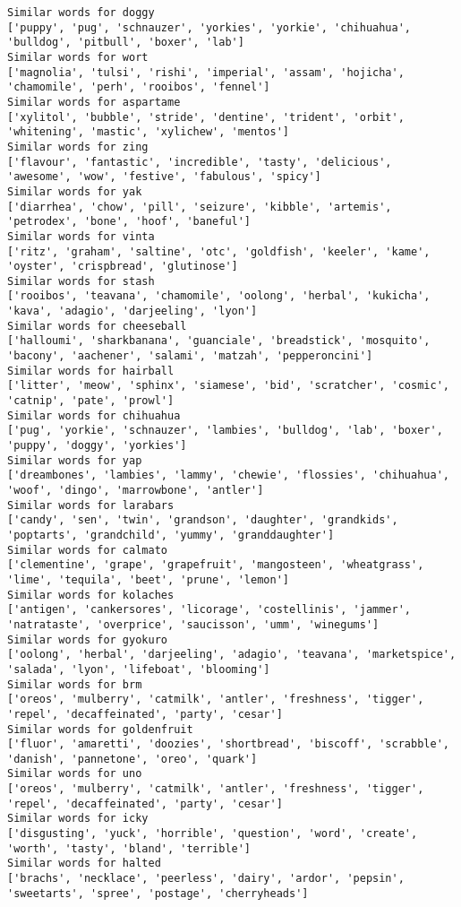 \documentclass[11pt]{article}
\begin{document}
\begin{Verbatim}[commandchars=\\\{\}]
Similar words for doggy
['puppy', 'pug', 'schnauzer', 'yorkies', 'yorkie', 'chihuahua', 'bulldog', 'pitbull', 'boxer', 'lab']
Similar words for wort
['magnolia', 'tulsi', 'rishi', 'imperial', 'assam', 'hojicha', 'chamomile', 'perh', 'rooibos', 'fennel']
Similar words for aspartame
['xylitol', 'bubble', 'stride', 'dentine', 'trident', 'orbit', 'whitening', 'mastic', 'xylichew', 'mentos']
Similar words for zing
['flavour', 'fantastic', 'incredible', 'tasty', 'delicious', 'awesome', 'wow', 'festive', 'fabulous', 'spicy']
Similar words for yak
['diarrhea', 'chow', 'pill', 'seizure', 'kibble', 'artemis', 'petrodex', 'bone', 'hoof', 'baneful']
Similar words for vinta
['ritz', 'graham', 'saltine', 'otc', 'goldfish', 'keeler', 'kame', 'oyster', 'crispbread', 'glutinose']
Similar words for stash
['rooibos', 'teavana', 'chamomile', 'oolong', 'herbal', 'kukicha', 'kava', 'adagio', 'darjeeling', 'lyon']
Similar words for cheeseball
['halloumi', 'sharkbanana', 'guanciale', 'breadstick', 'mosquito', 'bacony', 'aachener', 'salami', 'matzah', 'pepperoncini']
Similar words for hairball
['litter', 'meow', 'sphinx', 'siamese', 'bid', 'scratcher', 'cosmic', 'catnip', 'pate', 'prowl']
Similar words for chihuahua
['pug', 'yorkie', 'schnauzer', 'lambies', 'bulldog', 'lab', 'boxer', 'puppy', 'doggy', 'yorkies']
Similar words for yap
['dreambones', 'lambies', 'lammy', 'chewie', 'flossies', 'chihuahua', 'woof', 'dingo', 'marrowbone', 'antler']
Similar words for larabars
['candy', 'sen', 'twin', 'grandson', 'daughter', 'grandkids', 'poptarts', 'grandchild', 'yummy', 'granddaughter']
Similar words for calmato
['clementine', 'grape', 'grapefruit', 'mangosteen', 'wheatgrass', 'lime', 'tequila', 'beet', 'prune', 'lemon']
Similar words for kolaches
['antigen', 'cankersores', 'licorage', 'costellinis', 'jammer', 'natrataste', 'overprice', 'saucisson', 'umm', 'winegums']
Similar words for gyokuro
['oolong', 'herbal', 'darjeeling', 'adagio', 'teavana', 'marketspice', 'salada', 'lyon', 'lifeboat', 'blooming']
Similar words for brm
['oreos', 'mulberry', 'catmilk', 'antler', 'freshness', 'tigger', 'repel', 'decaffeinated', 'party', 'cesar']
Similar words for goldenfruit
['fluor', 'amaretti', 'doozies', 'shortbread', 'biscoff', 'scrabble', 'danish', 'pannetone', 'oreo', 'quark']
Similar words for uno
['oreos', 'mulberry', 'catmilk', 'antler', 'freshness', 'tigger', 'repel', 'decaffeinated', 'party', 'cesar']
Similar words for icky
['disgusting', 'yuck', 'horrible', 'question', 'word', 'create', 'worth', 'tasty', 'bland', 'terrible']
Similar words for halted
['brachs', 'necklace', 'peerless', 'dairy', 'ardor', 'pepsin', 'sweetarts', 'spree', 'postage', 'cherryheads']

\end{Verbatim}
\end{document}
